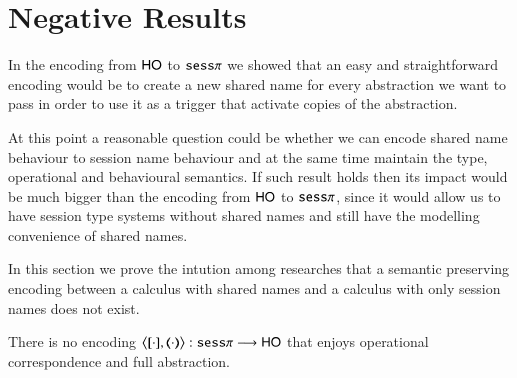 \section{Negative Results}

In the encoding from $\mathsf{HO}$ to $\mathtt{sess}\pi$ we showed that
an easy and straightforward encoding would be to create
a new shared name for every abstraction we want to pass
in order to use it as a trigger that activate copies of
the abstraction.

At this point a reasonable question could be whether we can
encode shared name behaviour to session name behaviour and at
the same time maintain the type, operational and behavioural semantics.
If such result holds then its impact would be much bigger than
the encoding from $\mathsf{HO}$ to $\mathtt{sess}\pi$, since it would
allow us to have session type systems without shared names
and still have the modelling convenience of shared names.

In this section we prove the intution among researches 
that a semantic preserving encoding between a calculus
with shared names and a calculus with only session names
does not exist.

\begin{theorem}{}\rm
	There is no encoding $\enc{\cdot}{\cdot}: \sesp \longrightarrow \HO$
	that enjoys operational correspondence and full abstraction.
\end{theorem}

